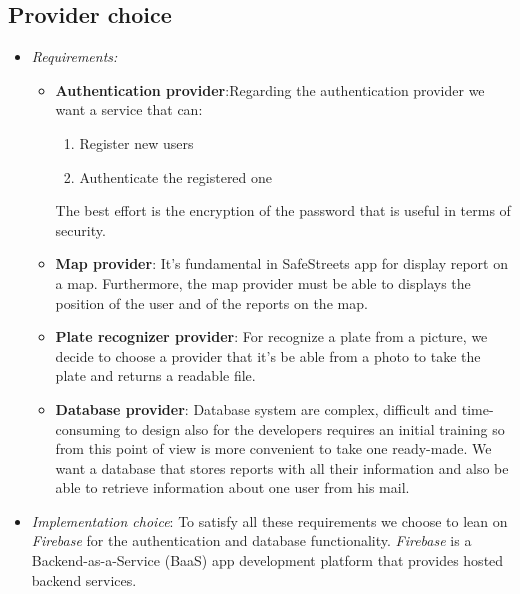 \documentclass[../RASD.tex]{subfiles}
\begin{document}
    \subsection{Provider choice}\label{subsec:provider-choice}
    \begin{itemize}
        \item \textit{Requirements:}
        \begin{itemize}
             \item \textbf{Authentication provider}:\newline Regarding the authentication provider we want a service that can:
             \begin{enumerate}
                 \item Register new users
                 \item Authenticate the registered one
             \end{enumerate}
             The best effort is the encryption of the password that is useful in terms of security.
             \item \textbf{Map provider}: \newline It’s fundamental in SafeStreets app for display report on a map.
             Furthermore, the map provider must be able to displays the position of the user and of the reports on the map.
             \item \textbf{Plate recognizer provider}: \newline For recognize a plate from a picture, we decide to choose a provider
             that it’s be able from a photo to take the plate and returns a readable file.
             \item \textbf{Database provider}: \newline Database system are complex, difficult and time-consuming to design also for the developers requires
             an initial training so from this point of view is more convenient to take one ready-made.
             We want a database that stores reports with all their information and also be able to retrieve information about one user from his mail.
        \end{itemize}
        \item \textit{Implementation choice}: \newline To satisfy all these requirements we choose to lean on \textit{Firebase}
        for the authentication and database functionality. \textit{Firebase} is a Backend-as-a-Service (BaaS) app development platform that provides
        hosted backend services.

\end{itemize}
\end{document}
